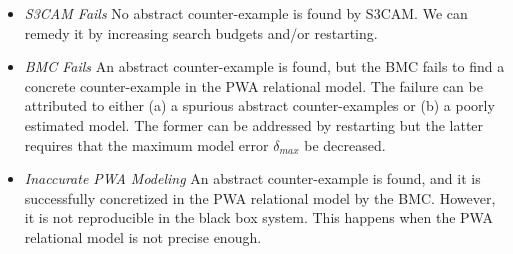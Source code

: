\begin{itemize}

    \item \emph{S3CAM Fails} No abstract counter-example is found by
        S3CAM. We can remedy it by increasing search budgets and/or
        restarting.

    \item \emph{BMC Fails} An abstract counter-example is found, but
        the BMC fails to find a concrete counter-example in the PWA
        relational model. The failure can be attributed to either (a)
        a spurious abstract counter-examples or (b) a poorly estimated
        model. The former can be addressed by restarting but the
        latter requires that the maximum model error $\delta_{max}$ be
        decreased.

    \item \emph{Inaccurate PWA Modeling} An abstract counter-example
        is found, and it is successfully concretized in the PWA
        relational model by the BMC. However, it is not reproducible
        in the black box system. This happens when the PWA relational
        model is not precise enough.

\end{itemize}

